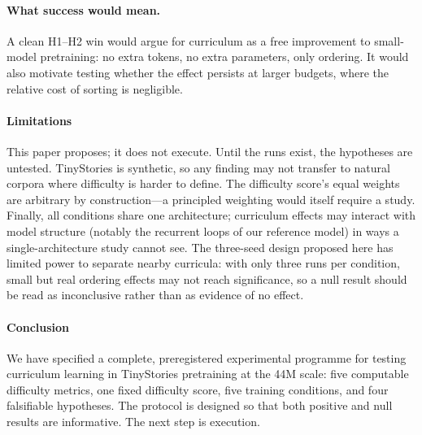 \paragraph{What success would mean.} A clean H1--H2 win would argue for
curriculum as a free improvement to small-model pretraining: no extra
tokens, no extra parameters, only ordering. It would also motivate
testing whether the effect persists at larger budgets, where the
relative cost of sorting is negligible.

\paragraph{Limitations}

This paper proposes; it does not execute. Until the runs exist, the
hypotheses are untested. TinyStories is synthetic, so any finding may
not transfer to natural corpora where difficulty is harder to define.
The difficulty score's equal weights are arbitrary by construction---a
principled weighting would itself require a study. Finally, all
conditions share one architecture; curriculum effects may interact with
model structure (notably the recurrent loops of our reference model) in
ways a single-architecture study cannot see. The three-seed design
proposed here has limited power to separate nearby curricula: with only
three runs per condition, small but real ordering effects may not reach
significance, so a null result should be read as inconclusive rather
than as evidence of no effect.

\paragraph{Conclusion}

We have specified a complete, preregistered experimental programme for
testing curriculum learning in TinyStories pretraining at the 44M
scale: five computable difficulty metrics, one fixed difficulty score,
five training conditions, and four falsifiable hypotheses. The protocol
is designed so that both positive and null results are informative. The
next step is execution.
